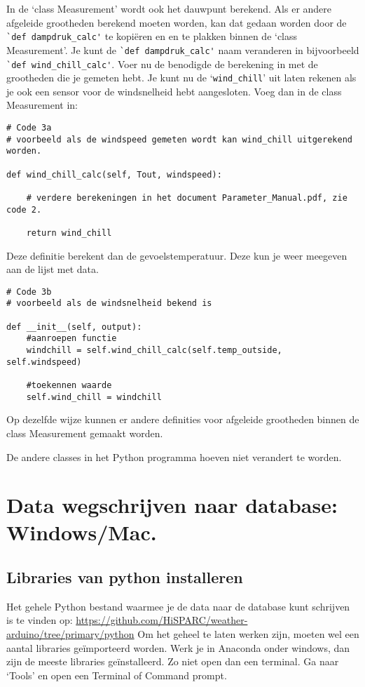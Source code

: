 In de `class Measurement' wordt ook het dauwpunt berekend. Als er andere
afgeleide grootheden berekend moeten worden, kan dat gedaan worden door
de \verb|`def dampdruk_calc'| te kopiëren en en te plakken binnen de
`class Measurement'. Je kunt de \verb|`def dampdruk_calc'| naam veranderen in
bijvoorbeeld \verb|`def wind_chill_calc'|. Voer nu de benodigde de berekening in
met de grootheden die je gemeten hebt. Je kunt nu de
`\verb|wind_chill|' uit laten rekenen als je ook een sensor voor de
windsnelheid hebt aangesloten. Voeg dan in de class Measurement in:

\begin{verbatim}
# Code 3a
# voorbeeld als de windspeed gemeten wordt kan wind_chill uitgerekend worden.

def wind_chill_calc(self, Tout, windspeed):

    # verdere berekeningen in het document Parameter_Manual.pdf, zie code 2.

    return wind_chill
\end{verbatim}

Deze definitie berekent dan de gevoelstemperatuur. Deze kun je weer meegeven aan
de lijst met data.

\begin{verbatim}
# Code 3b
# voorbeeld als de windsnelheid bekend is

def __init__(self, output):
    #aanroepen functie
    windchill = self.wind_chill_calc(self.temp_outside, self.windspeed)

    #toekennen waarde
    self.wind_chill = windchill
\end{verbatim}

Op dezelfde wijze kunnen er andere definities voor afgeleide grootheden
binnen de class Measurement gemaakt worden.

De andere classes in het Python programma hoeven niet verandert te worden.


\section{Data wegschrijven naar \hisparc database: Windows/Mac.}

\subsection{Libraries van python installeren}

Het gehele Python bestand waarmee je de data naar de \hisparc database kunt schrijven
is te vinden op:
\url{https://github.com/HiSPARC/weather-arduino/tree/primary/python}
Om het geheel te laten werken zijn, moeten wel een aantal libraries geïmporteerd worden.
Werk je in Anaconda onder windows, dan zijn de meeste libraries geïnstalleerd.
Zo niet open dan een terminal. Ga naar `Tools' en open een Terminal of Command prompt.

